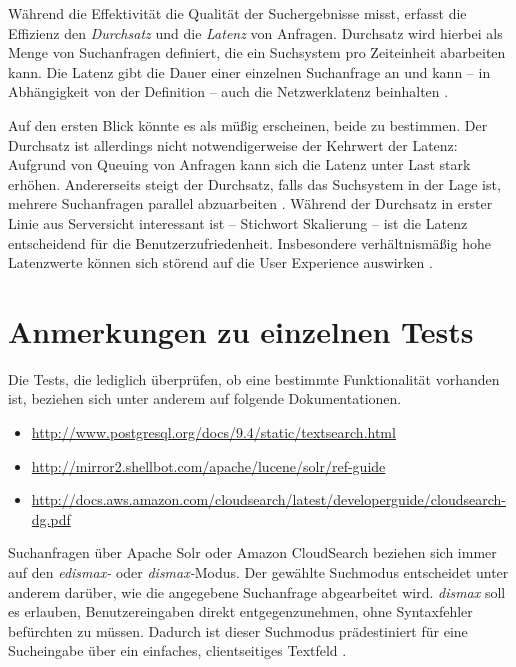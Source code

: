 Während die Effektivität die Qualität der Suchergebnisse misst, erfasst die Effizienz den \emph{Durchsatz} und die \emph{Latenz} von Anfragen. Durchsatz wird hierbei als Menge von Suchanfragen definiert, die ein Suchsystem pro Zeiteinheit abarbeiten kann. Die Latenz gibt die Dauer einer einzelnen Suchanfrage an und kann -- in Abhängigkeit von der Definition -- auch die Netzwerklatenz beinhalten \cite[S. 470]{Buttcher.2010}.

Auf den ersten Blick könnte es als müßig erscheinen, beide zu bestimmen. Der Durchsatz ist allerdings nicht notwendigerweise der Kehrwert der Latenz: Aufgrund von Queuing von Anfragen kann sich die Latenz unter Last stark erhöhen. Andererseits steigt der Durchsatz, falls das Suchsystem in der Lage ist, mehrere Suchanfragen parallel abzuarbeiten \cite[S. 471]{Buttcher.2010}. Während der Durchsatz in erster Linie aus Serversicht interessant ist -- Stichwort Skalierung -- ist die Latenz entscheidend für die Benutzerzufriedenheit. Insbesondere verhältnismäßig hohe Latenzwerte können sich störend auf die User Experience auswirken \cite[S. 472]{Buttcher.2010}.

\section{Anmerkungen zu einzelnen Tests} %
\label{sec:anmerkungen_zu_einzelnen_tests}

Die Tests, die lediglich überprüfen, ob eine bestimmte Funktionalität vorhanden ist, beziehen sich unter anderem auf folgende Dokumentationen.
\begin{itemize}
	\item \url{http://www.postgresql.org/docs/9.4/static/textsearch.html}
	\item \url{http://mirror2.shellbot.com/apache/lucene/solr/ref-guide}
	\item \url{http://docs.aws.amazon.com/cloudsearch/latest/developerguide/cloudsearch-dg.pdf}
\end{itemize}


Suchanfragen über Apache Solr oder Amazon CloudSearch beziehen sich immer auf den \emph{edismax-} oder \emph{dismax-}Modus. Der gewählte Suchmodus entscheidet unter anderem darüber, wie die angegebene Suchanfrage abgearbeitet wird. \emph{dismax} soll es erlauben, Benutzereingaben direkt entgegenzunehmen, ohne Syntaxfehler befürchten zu müssen. Dadurch ist dieser Suchmodus prädestiniert für eine Sucheingabe über ein einfaches, clientseitiges Textfeld \cite[S. 222f]{Grainger.2014}.

